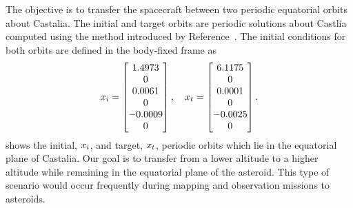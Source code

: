 The objective is to transfer the spacecraft between two periodic equatorial orbits about Castalia.
The initial and target orbits are periodic solutions about Castlia computed using the method introduced by Reference~\cite{scheeres2003}.
The initial conditions for both orbits are defined in the body-fixed frame as
\begin{align}\label{sec:initial_transfer}
    x_i = 
    \begin{bmatrix}
        1.4973 \\ 0 \\ 0.0061 \\ 0\\ -0.0009 \\ 0
    \end{bmatrix} ,
    \quad
    x_t =
    \begin{bmatrix}
        6.1175 \\ 0 \\ 0.0001 \\ 0\\ -0.0025 \\ 0
    \end{bmatrix} .
\end{align}
 shows the initial, \( x_i \), and target, \( x_t\), periodic orbits which lie in the equatorial plane of Castalia.
Our goal is to transfer from a lower altitude to a higher altitude while remaining in the equatorial plane of the asteroid.
This type of scenario would occur frequently during mapping and observation missions to asteroids.
